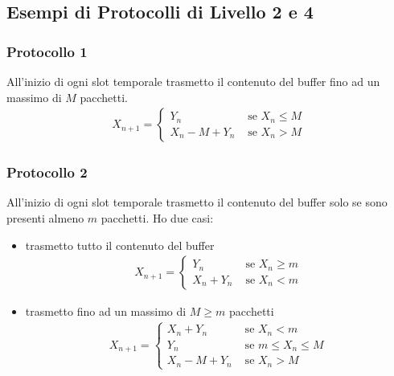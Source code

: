 \documentclass{article}
\begin{document}
\subsection{Esempi di Protocolli di Livello 2 e 4}

\subsubsection{Protocollo 1}
All'inizio di ogni slot temporale trasmetto il contenuto del buffer fino ad un massimo di $M$ pacchetti.
\begin{align*}
X_{n+1} = \begin{cases}
Y_n & \text{ se } X_n \le M\\
X_n - M + Y_n & \text{ se } X_n > M
\end{cases}
\end{align*}

\subsubsection{Protocollo 2}
All'inizio di ogni slot temporale trasmetto il contenuto del buffer solo se sono presenti almeno $m$ pacchetti. Ho due casi:
\begin{itemize}
    \item trasmetto tutto il contenuto del buffer
\begin{align*}
X_{n+1} = \begin{cases}
Y_n & \text{ se } X_n \ge m\\
X_n + Y_n & \text{ se } X_n < m
\end{cases}
\end{align*}

    \item trasmetto fino ad un massimo di $M \ge m$ pacchetti
\begin{align*}
X_{n+1} = \begin{cases}
X_n + Y_n & \text{ se } X_n < m\\
Y_n & \text{ se } m \le X_n \le M\\
X_n - M + Y_n & \text{ se } X_n > M
\end{cases}
\end{align*}
\end{itemize}
\end{document}
